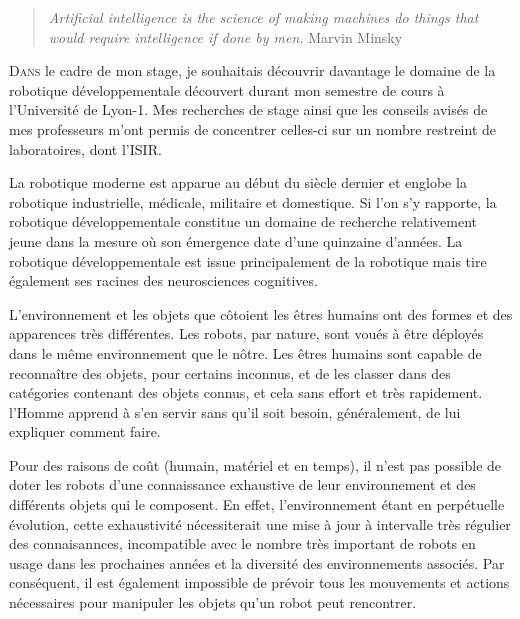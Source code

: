 \documentclass[draft]{llncs}
\begin{document}


 \begin{quotation}
  \textit{Artificial intelligence is the science of making machines do things that would require intelligence if done by men.} Marvin Minsky
 \end{quotation}

 
\lettrine{D}{ans} le cadre de mon stage, je souhaitais découvrir davantage le domaine de la robotique développementale découvert durant mon semestre de cours à l'Université de Lyon-1.
Mes recherches de stage ainsi que les conseils avisés de mes professeurs m'ont permis de concentrer celles-ci sur un nombre restreint de laboratoires, dont l'ISIR.

La robotique moderne est apparue au début du siècle dernier et englobe la robotique industrielle, médicale, militaire et domestique.
Si l'on s'y rapporte, la robotique développementale constitue un domaine de recherche relativement jeune dans la mesure où son émergence date d'une quinzaine d'années.
La robotique développementale est issue principalement de la robotique mais tire également ses racines des neurosciences cognitives.

L'environnement et les objets que côtoient les êtres humains ont des formes et des apparences très différentes.
Les robots, par nature, sont voués à être déployés dans le même environnement que le nôtre.
Les êtres humains sont capable de reconnaître des objets, pour certains inconnus, et de les classer dans des catégories contenant des objets connus, et cela sans effort et très rapidement.
l'Homme apprend à s'en servir sans qu'il soit besoin, généralement, de lui expliquer comment faire.

Pour des raisons de coût (humain, matériel et en temps), il n'est pas possible de doter les robots d'une connaissance exhaustive de leur environnement et des différents objets qui le composent.
En effet, l'environnement étant en perpétuelle évolution, cette exhaustivité nécessiterait une mise à jour à intervalle très régulier des connaisannces, incompatible avec le nombre très important de robots en usage dans les prochaines années et la diversité des environnements associés.
Par conséquent, il est également impossible de prévoir tous les mouvements et actions nécessaires pour manipuler les objets qu'un robot peut rencontrer.
\end{document}
